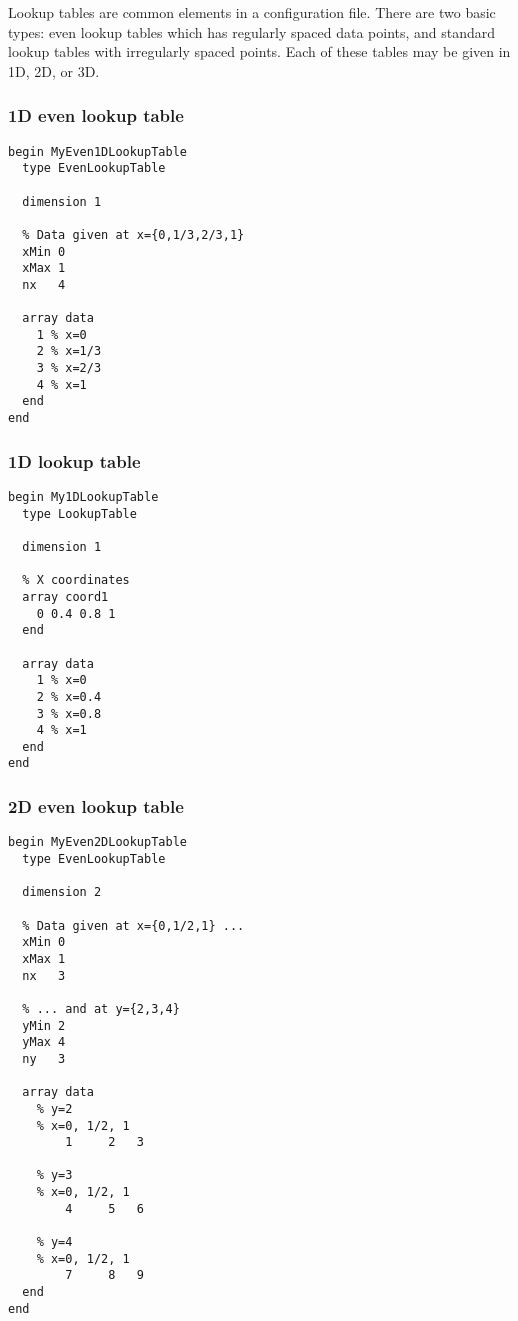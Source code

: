 
Lookup tables are common elements in a configuration file. There are two basic
types: even lookup tables which has regularly spaced data points, and standard
lookup tables with irregularly spaced points. Each of these tables may be
given in 1D, 2D, or 3D.


\subsubsection{1D even lookup table}

\begin{verbatim}
begin MyEven1DLookupTable
  type EvenLookupTable

  dimension 1

  % Data given at x={0,1/3,2/3,1}
  xMin 0
  xMax 1
  nx   4

  array data
    1 % x=0
    2 % x=1/3
    3 % x=2/3
    4 % x=1
  end
end
\end{verbatim}


\subsubsection{1D lookup table}

\begin{verbatim}
begin My1DLookupTable
  type LookupTable

  dimension 1

  % X coordinates
  array coord1
    0 0.4 0.8 1
  end

  array data
    1 % x=0
    2 % x=0.4
    3 % x=0.8
    4 % x=1
  end
end
\end{verbatim}


\subsubsection{2D even lookup table}

\begin{verbatim}
begin MyEven2DLookupTable
  type EvenLookupTable

  dimension 2

  % Data given at x={0,1/2,1} ...
  xMin 0
  xMax 1
  nx   3

  % ... and at y={2,3,4}
  yMin 2
  yMax 4
  ny   3

  array data
    % y=2
    % x=0, 1/2, 1
        1	  2   3

    % y=3
    % x=0, 1/2, 1
        4	  5   6

    % y=4
    % x=0, 1/2, 1
        7	  8   9
  end
end
\end{verbatim}

